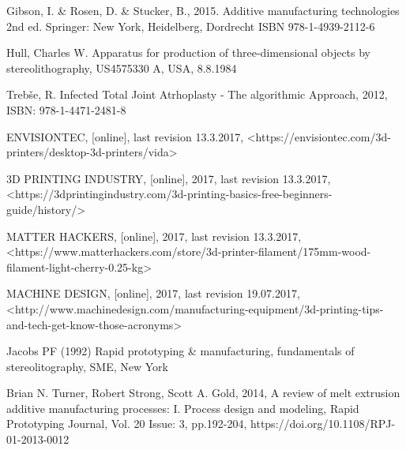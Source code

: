 \documentclass[a4paper, twoside, 11pt]{report}
\begin{document}
\begin{thebibliography}{99}
	Gibson, I. \& Rosen, D. \& Stucker, B.,
	2015.
	Additive manufacturing technologies
	2nd ed.
	Springer:
	New York, Heidelberg, Dordrecht
	ISBN 978-1-4939-2112-6
	
	Hull, Charles W.
	Apparatus for production of three-dimensional objects by stereolithography,
	US4575330 A,
	USA,
	8.8.1984
	
	Trebše, R.
	Infected Total Joint Atrhoplasty - The algorithmic Approach,
	2012,
	ISBN: 978-1-4471-2481-8
	
	ENVISIONTEC,
	[online],
	last revision 13.3.2017,
	<https://envisiontec.com/3d-printers/desktop-3d-printers/vida>
	
	3D PRINTING INDUSTRY,
	[online],
	2017,
	last revision 13.3.2017,
	<https://3dprintingindustry.com/3d-printing-basics-free-beginners-guide/history/>
	
	MATTER HACKERS,
	[online],
	2017,
	last revision 13.3.2017,
	<https://www.matterhackers.com/store/3d-printer-filament/175mm-wood-filament-light-cherry-0.25-kg>
	
	MACHINE DESIGN,
	[online],
	2017,
	last revision 19.07.2017,
	<http://www.machinedesign.com/manufacturing-equipment/3d-printing-tips-and-tech-get-know-those-acronyms>
	
	Jacobs PF (1992)
	Rapid prototyping \& manufacturing,
	fundamentals of stereolitography,
	SME,
	New York
	
	Brian N. Turner, Robert Strong, Scott A. Gold,
	2014,
	A review of melt extrusion additive manufacturing processes: I. Process design and modeling,
	Rapid Prototyping Journal, Vol. 20 Issue: 3, pp.192-204,
	https://doi.org/10.1108/RPJ-01-2013-0012
	

	
\end{thebibliography}
\end{document}
